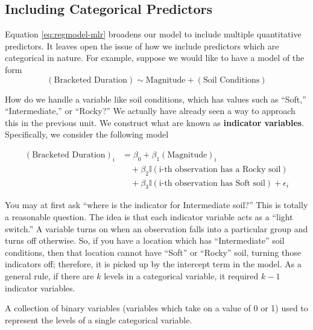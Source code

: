 \documentclass[]{book}
\theoremstyle{definition}
\theoremstyle{definition}
\theoremstyle{definition}
\theoremstyle{remark}
\let\BeginKnitrBlock\begin \let\EndKnitrBlock\end
\begin{document}
\subsection{Including Categorical
Predictors}\label{including-categorical-predictors}

Equation \eqref{eq:regmodel-mlr} broadens our model to include multiple
quantitative predictors. It leaves open the issue of how we include
predictors which are categorical in nature. For example, suppose we
would like to have a model of the form
\[(\text{Bracketed Duration}) \sim \text{Magnitude} + (\text{Soil Conditions})\]

How do we handle a variable like soil conditions, which has values such
as ``Soft,'' ``Intermediate,'' or ``Rocky?'' We actually have already
seen a way to approach this in the previous unit. We construct what are
known as \textbf{indicator variables}. Specifically, we consider the
following model

\begin{equation}
  \begin{aligned}
    (\text{Bracketed Duration})_i &= \beta_0 + \beta_1(\text{Magnitude})_i \\
      &\quad + \beta_2\mathbb{I}(\text{i-th observation has a Rocky soil}) \\
      &\quad + \beta_3\mathbb{I}(\text{i-th observation has Soft soil}) + \epsilon_i
  \end{aligned}
  \label{eq:regmodel-ind}
\end{equation}

You may at first ask ``where is the indicator for Intermediate soil?''
This is totally a reasonable question. The idea is that each indicator
variable acts as a ``light switch.'' A variable turns on when an
observation falls into a particular group and turns off otherwise. So,
if you have a location which has ``Intermediate'' soil conditions, then
that location cannot have ``Soft'' or ``Rocky'' soil, turning those
indicators off; therefore, it is picked up by the intercept term in the
model. As a general rule, if there are \(k\) levels in a categorical
variable, it required \(k-1\) indicator variables.

\BeginKnitrBlock{definition}[Indicator Variables]
\protect\hypertarget{def:defn-indicator-variable}{}{\label{def:defn-indicator-variable}
{} }A collection of binary variables
(variables which take on a value of 0 or 1) used to represent the levels
of a single categorical variable.
\EndKnitrBlock{definition}
\end{document}
